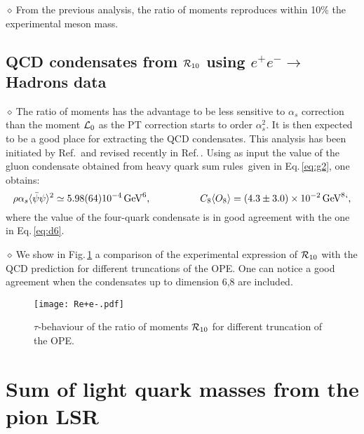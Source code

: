\documentclass[aps,prd,groupedaddress,nofootinbib]{revtex4-1}
\def\beq{\begin{equation}}
\def\eeq{\end{equation}}
\def\la{\langle}
\def\ra{\rangle}
\def\d{$\diamond~$}
\begin{document}
\d From the previous analysis, the ratio of moments reproduces within 10\% the experimental meson mass. 
\subsection{QCD condensates from ${\cal R}_{10}$ using $e^+e^-\to$ Hadrons data}
\d The ratio of moments has the advantage to be less sensitive to $\alpha_s$ correction than the moment  ${\cal L}_{0}$ as the PT correction starts to order $\alpha_s^2$. It is then expected to be a good place for extracting the QCD condensates. This analysis has been initiated by Ref.\,\cite{LNT} and revised recently in Ref.\,\cite{SNe23}. Using as input the value of the gluon condensate obtained from heavy quark sum rules\,\cite{SNparam,SNREV22,SNREV21} given in Eq.\,\ref{eq:g2}, one obtains:
\beq
\rho \alpha_s\la\bar\psi\psi\ra^2\simeq 5.98(64)10^{-4}\,{\rm GeV}^6,~~~~~~ ~~~~~~~~~C_8\la O_8\ra=(4.3\pm 3.0)\times 10^{-2}\,{\rm GeV}^8`, 
\eeq
where the value of the four-quark condensate is in good agreement with the one in Eq.\,\ref{eq:d6}. 

\d We show in Fig.\,\ref{fig:Ree} a comparison of the experimental expression of ${\cal R}_{10}$ with the QCD prediction for different truncations of the OPE. One can notice a good agreement when the condensates up to dimension 6,8 are included. 
\begin{figure}[hbt]
\begin{center}
\texttt{[image: Re+e-.pdf]}
\caption{\normalsize  $\tau$-behaviour of the ratio of moments ${\cal R}_{10}$ for different truncation of the OPE.}\label{fig:Ree}
\end{center}
\vspace*{-0.5cm}
\end{figure} 
\section{Sum of light quark masses from the pion LSR}
\end{document}

